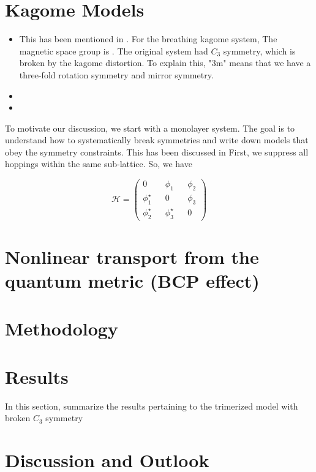 \documentclass[reprint,aps,superscriptaddress]{revtex4-2}
\begin{document}
\section{Kagome Models}

\begin{itemize}
    \item {} This has 
    been mentioned in \cite{herreraCornerModesBreathing2022}. For the breathing 
    kagome system, 
    The magnetic space group is . The original system had $C_3$
    symmetry, which is broken by the kagome distortion. 
    To explain this, "3m" means that we have a three-fold rotation symmetry
    and mirror symmetry. 
    \item {}
    \item 
\end{itemize}


To motivate our discussion, we start with a monolayer system. The goal is to 
understand how to systematically break symmetries and write down models that 
obey the symmetry constraints. This has been discussed in
 \cite{geschnerBandTopologyBreathing2024}
First, we suppress all hoppings within the same sub-lattice. So, we have

\begin{equation}
   \mathcal{H} =  \begin{pmatrix}
    0 && \phi_1 && \phi_2 \\
    \phi_1^{\star} && 0 && \phi_3 \\
    \phi_2^{\star} && \phi_3^{\star} && 0
    \end{pmatrix}
\end{equation}


\section{Nonlinear transport from the quantum metric (BCP effect)}


\section{Methodology}


\section{Results}

In this section, summarize the results pertaining to the trimerized model with broken 
$C_3$ symmetry 

\section{Discussion and Outlook}



\end{document}
